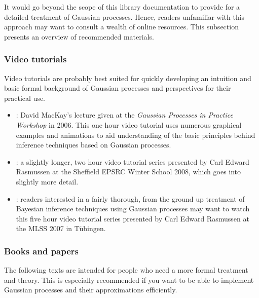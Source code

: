 \documentclass[10pt]{article}
\begin{document}
It would go beyond the scope of this library documentation to provide
for a detailed treatment of Gaussian processes.  Hence, readers
unfamiliar with this approach may want to consult a wealth of online
resources.  This subsection presents an overview of recommended
materials.

\subsubsection{Video tutorials}

Video tutorials are probably best suited for quickly developing an
intuition and basic formal background of Gaussian processes and
perspectives for their practical use.

\begin{itemize}

\item
\emph{}: David MacKay's lecture given at the \emph{Gaussian
Processes in Practice Workshop} in 2006.  This one hour video
tutorial uses numerous graphical examples and animations to aid
understanding of the basic principles behind inference techniques
based on Gaussian processes.

\item
\emph{}: a slightly longer, two hour video tutorial
series presented by Carl Edward Rasmussen at the Sheffield EPSRC
Winter School 2008, which goes into slightly more detail.

\item
\emph{}: readers interested in a fairly
thorough, from the ground up treatment of Bayesian inference
techniques using Gaussian processes may want to watch this five
hour video tutorial series presented by Carl Edward Rasmussen at
the MLSS 2007 in T\"ubingen.

\end{itemize}

\subsubsection{Books and papers}

The following texts are intended for people who need a more formal
treatment and theory.  This is especially recommended if you want
to be able to implement Gaussian processes and their approximations
efficiently.
\end{document}
